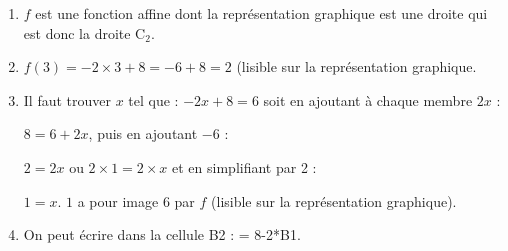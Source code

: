 
\medskip

%
%
%
%
%
%
%
%
%
%
\begin{enumerate}
\item $f$ est une fonction affine dont la représentation graphique est une droite qui est donc la droite C$_2$.
\item $f(3) = - 2 \times 3 + 8 = - 6 + 8 = 2$ (lisible sur la représentation graphique.
\item Il faut trouver $x$ tel que :
$- 2x + 8 = 6$ soit en ajoutant à chaque membre $2x$ :

$8 = 6 + 2x$, puis en ajoutant $- 6$ :

$2 = 2x$ ou $2\times 1 = 2\times x$ et en simplifiant par 2 : 

$1 = x$. $1$ a pour image $6$ par $f$ (lisible sur la représentation graphique).
\item On peut écrire dans la cellule B2 : = 8-2*B1.
\end{enumerate}
